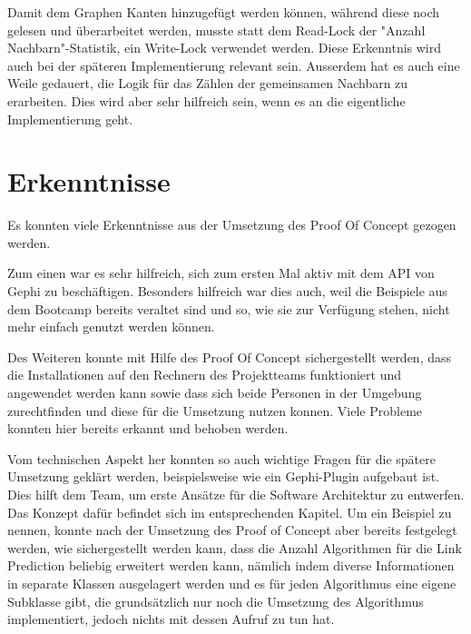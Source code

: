 Damit dem Graphen Kanten hinzugefügt werden können, während diese noch gelesen und überarbeitet werden, musste statt
dem Read-Lock der "Anzahl Nachbarn"-Statistik, ein Write-Lock verwendet werden. Diese Erkenntnis wird auch bei der
späteren Implementierung relevant sein. Ausserdem hat es auch eine Weile gedauert, die Logik für das Zählen der
gemeinsamen Nachbarn zu erarbeiten. Dies wird aber sehr hilfreich sein, wenn es an die eigentliche Implementierung geht.

\section{Erkenntnisse}

Es konnten viele Erkenntnisse aus der Umsetzung des Proof Of Concept gezogen werden.

Zum einen war es sehr hilfreich, sich zum ersten Mal aktiv mit dem API von Gephi zu beschäftigen. Besonders hilfreich
war dies auch, weil die Beispiele aus dem Bootcamp bereits veraltet sind und so, wie sie zur Verfügung stehen, nicht
mehr einfach genutzt werden können.

Des Weiteren konnte mit Hilfe des Proof Of Concept sichergestellt werden, dass die Installationen auf den Rechnern des
Projektteams funktioniert und angewendet werden kann sowie dass sich beide Personen in der Umgebung zurechtfinden und
diese für die Umsetzung nutzen konnen. Viele Probleme konnten hier bereits erkannt und behoben werden.

Vom technischen Aspekt her konnten so auch wichtige Fragen für die spätere Umsetzung geklärt werden, beispielsweise
wie ein Gephi-Plugin aufgebaut ist. Dies hilft dem Team, um erste Ansätze für die Software Architektur zu entwerfen.
Das Konzept dafür befindet sich im entsprechenden Kapitel. Um ein Beispiel zu nennen, konnte nach der Umsetzung des
Proof of Concept aber bereits festgelegt werden, wie sichergestellt werden kann, dass die Anzahl Algorithmen für die
Link Prediction beliebig erweitert werden kann, nämlich indem diverse Informationen in separate Klassen ausgelagert
werden und es für jeden Algorithmus eine eigene Subklasse gibt, die grundsätzlich nur noch die Umsetzung des Algorithmus
implementiert, jedoch nichts mit dessen Aufruf zu tun hat.